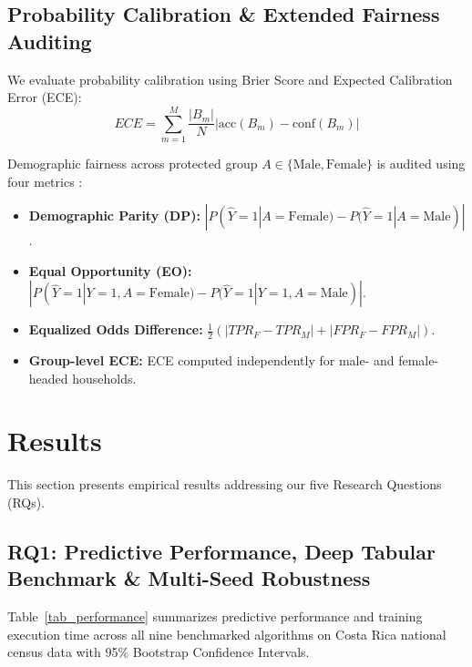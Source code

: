 \documentclass[conference]{IEEEtran}
\begin{document}
\subsection{Probability Calibration & Extended Fairness Auditing}
We evaluate probability calibration using Brier Score \cite{b26} and Expected Calibration Error (ECE):
\begin{equation}
ECE = \sum_{m=1}^M \frac{|B_m|}{N} \left| \text{acc}(B_m) - \text{conf}(B_m) \right|
\end{equation}

Demographic fairness across protected group $A \in \{\text{Male}, \text{Female}\}$ is audited using four metrics \cite{b27}:
\begin{itemize}
\item \textbf{Demographic Parity (DP):} $|P(\hat{Y}=1 | A=\text{Female}) - P(\hat{Y}=1 | A=\text{Male})|$.
\item \textbf{Equal Opportunity (EO):} $|P(\hat{Y}=1 | Y=1, A=\text{Female}) - P(\hat{Y}=1 | Y=1, A=\text{Male})|$.
\item \textbf{Equalized Odds Difference:} $\frac{1}{2} (|TPR_F - TPR_M| + |FPR_F - FPR_M|)$.
\item \textbf{Group-level ECE:} ECE computed independently for male- and female-headed households.
\end{itemize}


\section{Results}

This section presents empirical results addressing our five Research Questions (RQs).

\subsection{RQ1: Predictive Performance, Deep Tabular Benchmark & Multi-Seed Robustness}

Table~\ref{tab_performance} summarizes predictive performance and training execution time across all nine benchmarked algorithms on Costa Rica national census data with 95\% Bootstrap Confidence Intervals.
\end{document}
